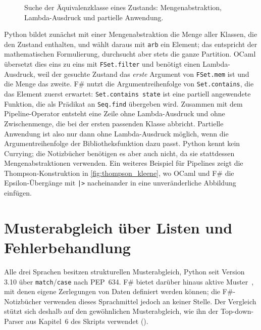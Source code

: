 \begin{figure}[tbp]



\caption{Suche der Äquivalenzklasse eines Zustands: Mengenabstraktion, Lambda-Ausdruck und partielle Anwendung.}
\label{fig:find_class}
\end{figure}

Python bildet zunächst mit einer Mengenabstraktion die Menge aller Klassen, die den Zustand enthalten, und wählt daraus mit \texttt{arb} ein Element; das entspricht der mathematischen Formulierung, durchsucht aber stets die ganze Partition.
OCaml übersetzt dies eins zu eins mit \texttt{FSet.filter} und benötigt einen Lambda-Ausdruck, weil der gesuchte Zustand das \emph{erste} Argument von \texttt{FSet.mem} ist und die Menge das zweite.
F\# nutzt die Argumentreihenfolge von \texttt{Set.contains}, die das Element zuerst erwartet: \texttt{Set.contains state} ist eine partiell angewendete Funktion, die als Prädikat an \texttt{Seq.find} übergeben wird.
Zusammen mit dem Pipeline-Operator entsteht eine Zeile ohne Lambda-Ausdruck und ohne Zwischenmenge, die bei der ersten passenden Klasse abbricht.
Partielle Anwendung ist also nur dann ohne Lambda-Ausdruck möglich, wenn die Argumentreihenfolge der Bibliotheksfunktion dazu passt.
Python kennt kein Currying; die Notizbücher benötigen es aber auch nicht, da sie stattdessen Mengenabstraktionen verwenden.
Ein weiteres Beispiel für Pipelines zeigt die Thompson-Konstruktion in \cref{fig:thompson_kleene}, wo OCaml und F\# die Epsilon-Übergänge mit \texttt{|>} nacheinander in eine unveränderliche Abbildung einfügen.

\section{Musterabgleich über Listen und Fehlerbehandlung}
\label{sec:pattern_matching}

Alle drei Sprachen besitzen strukturellen Musterabgleich, Python seit Version 3.10 über \texttt{match}/\texttt{case} nach PEP~634.
F\# bietet darüber hinaus aktive Muster~\cite{syme2007extensible}, mit denen eigene Zerlegungen von Daten definiert werden können; die F\#-Notizbücher verwenden dieses Sprachmittel jedoch an keiner Stelle.
Der Vergleich stützt sich deshalb auf den gewöhnlichen Musterabgleich, wie ihn der Top-down-Parser aus Kapitel~6 des Skripts verwendet ().

